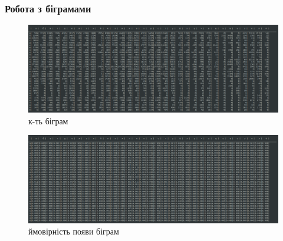 \documentclass[12pt]{article}
\begin{document}
\newpage
\subsubsection{Робота з біграмами}
\begin{figure}[htbp]
    \centering
    \includegraphics[width=1.0\textwidth]{screenshots/bigram_freq_without_space.png}
    \caption{к-ть біграм}
    \label{fig:screenshot}
\end{figure}
\begin{figure}[htbp]
    \centering
    \includegraphics[width=1.0\textwidth]{screenshots/bigram_prob_without_space.png}
    \caption{ймовірність появи біграм}
    \label{fig:screenshot}
\end{figure}
\end{document}
